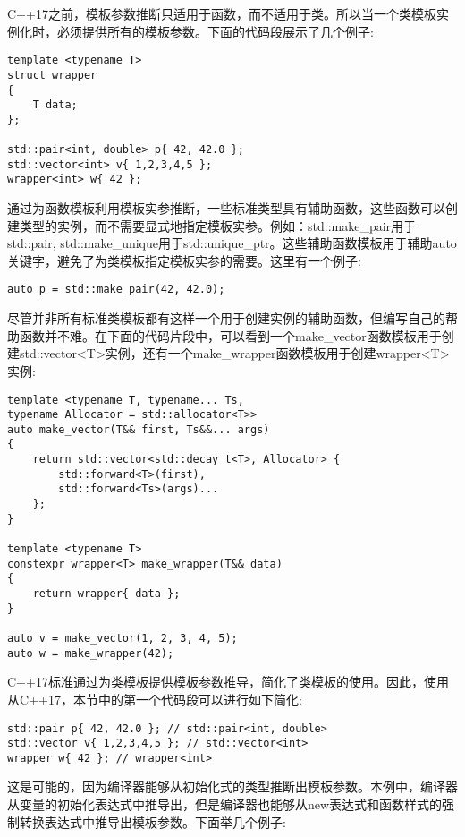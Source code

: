 C++17之前，模板参数推断只适用于函数，而不适用于类。所以当一个类模板实例化时，必须提供所有的模板参数。下面的代码段展示了几个例子:

\begin{lstlisting}[style=styleCXX]
template <typename T>
struct wrapper
{
	T data;
};

std::pair<int, double> p{ 42, 42.0 };
std::vector<int> v{ 1,2,3,4,5 };
wrapper<int> w{ 42 };
\end{lstlisting}

通过为函数模板利用模板实参推断，一些标准类型具有辅助函数，这些函数可以创建类型的实例，而不需要显式地指定模板实参。例如：std::make\_pair用于std::pair, std::make\_unique用于std::unique\_ptr。这些辅助函数模板用于辅助auto关键字，避免了为类模板指定模板实参的需要。这里有一个例子:

\begin{lstlisting}[style=styleCXX]
auto p = std::make_pair(42, 42.0);
\end{lstlisting}

尽管并非所有标准类模板都有这样一个用于创建实例的辅助函数，但编写自己的帮助函数并不难。在下面的代码片段中，可以看到一个make\_vector函数模板用于创建std::vector<T>实例，还有一个make\_wrapper函数模板用于创建wrapper<T>实例:

\begin{lstlisting}[style=styleCXX]
template <typename T, typename... Ts,
typename Allocator = std::allocator<T>>
auto make_vector(T&& first, Ts&&... args)
{
	return std::vector<std::decay_t<T>, Allocator> {
		std::forward<T>(first),
		std::forward<Ts>(args)...
	};
}

template <typename T>
constexpr wrapper<T> make_wrapper(T&& data)
{
	return wrapper{ data };
}

auto v = make_vector(1, 2, 3, 4, 5);
auto w = make_wrapper(42);
\end{lstlisting}

C++17标准通过为类模板提供模板参数推导，简化了类模板的使用。因此，使用从C++17，本节中的第一个代码段可以进行如下简化:

\begin{lstlisting}[style=styleCXX]
std::pair p{ 42, 42.0 }; // std::pair<int, double>
std::vector v{ 1,2,3,4,5 }; // std::vector<int>
wrapper w{ 42 }; // wrapper<int>
\end{lstlisting}

这是可能的，因为编译器能够从初始化式的类型推断出模板参数。本例中，编译器从变量的初始化表达式中推导出，但是编译器也能够从new表达式和函数样式的强制转换表达式中推导出模板参数。下面举几个例子:

